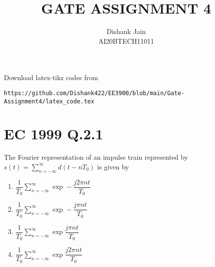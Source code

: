 \documentclass[journal,12pt,twocolumn]{IEEEtran}
\begin{document}
     \def\centbox#1{\makebox[0in]{#1}}
     \def\topbox#1{\raisebox{-\baselineskip}[0in][0in]{#1}}
     \def\midbox#1{\raisebox{-0.5\baselineskip}[0in][0in]{#1}}
\vspace{3cm}
\title{GATE ASSIGNMENT 4}
\author{Dishank Jain \\ AI20BTECH11011}
\maketitle
\newpage
\bigskip
\renewcommand{\thefigure}{\theenumi}
\renewcommand{\thetable}{\theenumi}
Download latex-tikz codes from
%
\begin{lstlisting}
https://github.com/Dishank422/EE3900/blob/main/Gate-Assignment4/latex_code.tex
\end{lstlisting}
%
\section{EC 1999 Q.2.1}
The Fourier representation of an impulse train represented by $s(t) = \sum_{n=-\infty}^{\infty}d(t-nT_0)$ is given by
\begin{enumerate}[label=(\alph*)]
    \item $\dfrac{1}{T_0}\sum_{n=-\infty}^{\infty}\exp-\dfrac{j2\pi nt}{T_0}$
    \item $\dfrac{1}{T_0}\sum_{n=-\infty}^{\infty}\exp-\dfrac{j\pi nt}{T_0}$
    \item $\dfrac{1}{T_0}\sum_{n=-\infty}^{\infty}\exp\dfrac{j\pi nt}{T_0}$
    \item $\dfrac{1}{T_0}\sum_{n=-\infty}^{\infty}\exp\dfrac{j2\pi nt}{T_0}$
\end{enumerate}
\end{document}
